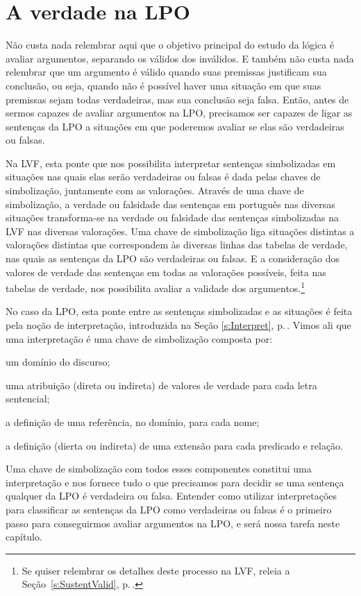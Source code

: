 \chapter{A verdade na LPO}\label{s:TruthFOL}
Não custa nada relembrar aqui que o objetivo principal do estudo da lógica é avaliar argumentos, separando os válidos dos inválidos.
E também não custa nada relembrar que um argumento é válido quando suas premissas justificam sua conclusão, ou seja, quando não é possível haver uma situação em que suas premissas sejam todas verdadeiras, mas sua conclusão seja falsa.
Então, antes de sermos capazes de avaliar argumentos na LPO, precisamos ser capazes de ligar as sentenças da LPO a situações em que poderemos avaliar se elas são verdadeiras ou falsas.

Na LVF, esta ponte que nos possibilita interpretar sentenças simbolizadas em situações nas quais elas serão verdadeiras ou falsas é dada pelas chaves de simbolização, juntamente com as valorações.
Através de uma chave de simbolização, a verdade ou falsidade das sentenças em português nas diversas situações transforma-se na verdade ou falsidade das sentenças simbolizadas na LVF nas diversas valorações.
Uma chave de simbolização liga situações distintas a valorações distintas que correspondem às diversas linhas das tabelas de verdade, nas quais as sentenças da LPO são verdadeiras ou falsas.
E a consideração dos valores de verdade das sentenças em todas as valorações possíveis, feita nas tabelas de verdade, nos possibilita avaliar a validade dos argumentos.\footnote{
	Se quiser relembrar os detalhes deste processo na LVF, releia a Seção~\ref{s:SustentValid}, p.\,\pageref{s:SustentValid}.}

No caso da LPO, esta ponte entre as sentenças simbolizadas e as situações é feita pela noção de interpretação, introduzida na Seção \ref{s:Interpret}, p.\,\pageref{s:Interpret}.
Vimos ali que uma interpretação é uma chave de simbolização composta por: 
\begin{ebullet}
	\item um domínio do discurso;
	\item uma atribuição (direta ou indireta) de valores de verdade para cada letra sentencial;
	\item a definição de uma referência, no domínio, para cada nome;
	\item a definição (dierta ou indireta) de uma extensão para cada predicado e relação.
\end{ebullet}
Uma chave de simbolização com todos esses componentes constitui uma interpretação e nos fornece tudo o que precisamos para decidir se uma sentença qualquer da LPO é verdadeira ou falsa.
Entender como utilizar interpretações para classificar as sentenças da LPO como verdadeiras ou falsas é o primeiro passo para conseguirmos avaliar argumentos na LPO, e será nossa tarefa neste capítulo.

